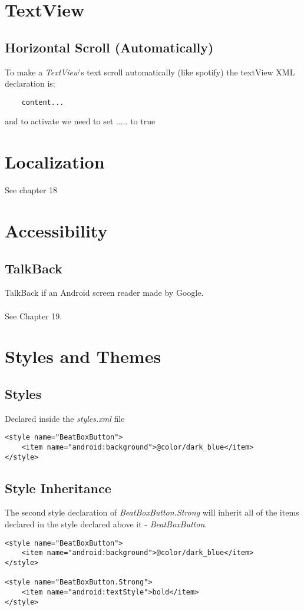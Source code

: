 \documentclass[]{article}
\renewcommand{\it}[1]{\textit{#1}}
\begin{document}
\section{TextView}

\subsection{Horizontal Scroll (Automatically)}
To make a \it{TextView}'s text scroll automatically (like spotify) the textView XML declaration is:
\begin{lstlisting}
	content...
\end{lstlisting}
and to activate we need to set ..... to true

\section{Localization}
See chapter 18

\section{Accessibility}
\subsection{TalkBack}
TalkBack if an Android screen reader made by Google.
\\\\
See Chapter 19.

\section{Styles and Themes}
\subsection{Styles}
Declared inside the \textit{styles.xml} file
\begin{lstlisting}
<style name="BeatBoxButton">
	<item name="android:background">@color/dark_blue</item>
</style>
\end{lstlisting}

\subsection{Style Inheritance}
The second style declaration of \textit{BeatBoxButton.Strong} will inherit all of the items declared in the style declared above it - \textit{BeatBoxButton}.
\begin{lstlisting}
<style name="BeatBoxButton">
	<item name="android:background">@color/dark_blue</item>
</style>

<style name="BeatBoxButton.Strong">
	<item name="android:textStyle">bold</item>
</style>
\end{lstlisting}
\end{document}
